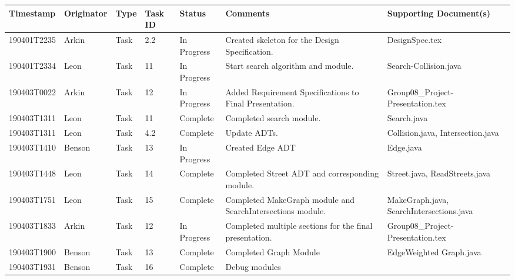 \documentclass[12pt]{article}
\begin{document}
\begin{center}
    \begin{tabular}{| P{2.5cm} | P{2.2cm} | P{1.4cm} | P{0.9cm} | P{1.9cm} | P{2.8cm} | P{3cm} |}
        \hline
        \textbf{Timestamp} & \textbf{Originator} & \textbf{Type} 
        & \textbf{Task ID} & \textbf{Status} & \textbf{Comments} 
        & \textbf{Supporting Document(s)}\\
        \hline
        190401T2235 & Arkin & Task & 2.2 & In Progress & Created skeleton for the Design Specification. & DesignSpec.tex \\
        \hline
        190401T2334 & Leon & Task & 11 & In Progress & Start search algorithm and module. & Search-Collision.java \\
        \hline
        190403T0022 & Arkin & Task & 12 & In Progress & Added Requirement Specifications to Final Presentation. & Group08\_Project-Presentation.tex \\
        \hline
        190403T1311 & Leon & Task & 11 & Complete & Completed search module. & Search.java \\
        \hline
        190403T1311 & Leon & Task & 4.2 & Complete & Update ADTs. & Collision.java, Intersection.java \\
        \hline
        190403T1410 & Benson & Task & 13 & In Progress & Created Edge ADT & Edge.java\\
        \hline
        190403T1448 & Leon & Task & 14 & Complete & Completed Street ADT and corresponding module. & Street.java, ReadStreets.java \\
        \hline
        190403T1751 & Leon & Task & 15 & Complete & Completed MakeGraph module and SearchIntersections module. & MakeGraph.java, SearchIntersections.java \\
        \hline
        190403T1833 & Arkin & Task & 12 & In Progress & Completed multiple sections for the final presentation. & Group08\_Project-Presentation.tex \\
        \hline
        190403T1900 & Benson & Task & 13 & Complete & Completed Graph Module &
        EdgeWeighted
        Graph.java \\
        \hline
        190403T1931 & Benson & Task & 16 & Complete & Debug modules & \\
        \hline
    \end{tabular}
    

\end{center}
\end{document}
